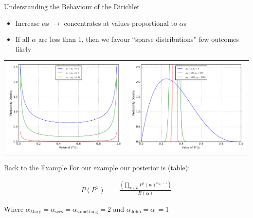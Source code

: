 \documentclass[11pt]{beamer}
\begin{document}
	\begin{frame}{Understanding the Behaviour of the Dirichlet}
		\begin{itemize}
			\item Increase $\alpha$s $\rightarrow$ concentrates at values proportional to $\alpha$s
			\item If all $\alpha$ are less than 1, then we favour ``sparse distributions'' few outcomes likely
		\end{itemize}
		
		\begin{tabular}{lr}
			\includegraphics[width=0.49\linewidth]{dirichlet_distribution_sparse_pdf} &
			\includegraphics[width=0.49\linewidth]{dirichlet_distribution_dense_pdf} \\
		\end{tabular}
	\end{frame}
		
	\begin{frame}{Back to the Example}
		For our example our posterior is (table):

		\vspace{10pt}		
		\begin{align*}
			P(P^x) & = \frac{\left(\prod_{w \in L} P^{x}(w)^{\alpha_{w_i}-1}\right)}{B(\boldsymbol{\alpha})}
		\end{align*}
		
		\vspace{10pt} Where $\alpha_{\text{Mary}}=\alpha_{\text{sees}} = \alpha_{\text{something}} = 2$ and $\alpha_{\text{John}}=\alpha_{\text{.}}=1$
	\end{frame}
	
\end{document}
